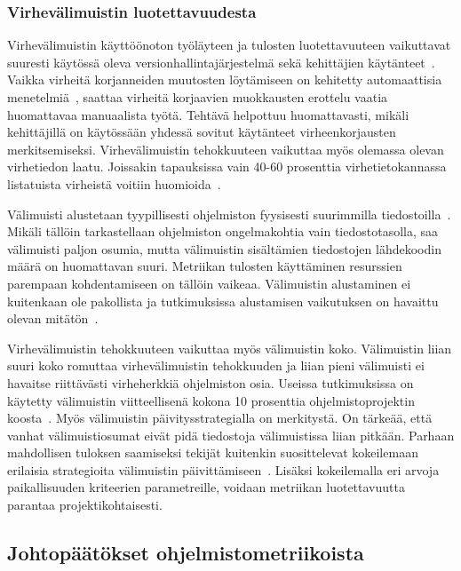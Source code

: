 \documentclass[finnish]{tktltiki2}
\theoremstyle{definition}
\theoremstyle{remark}
\begin{document}
\subsubsection{Virhevälimuistin luotettavuudesta}

Virhevälimuistin käyttöönoton työläyteen ja tulosten luotettavuuteen vaikuttavat suuresti käytössä oleva versionhallintajärjestelmä sekä kehittäjien käytänteet~\cite{SLLZW11}. Vaikka virheitä korjanneiden muutosten löytämiseen on kehitetty automaattisia menetelmiä~\cite{SZZ05, KZKW06}, saattaa virheitä korjaavien muokkausten erottelu vaatia huomattavaa manuaalista työtä. Tehtävä helpottuu huomattavasti, mikäli kehittäjillä on käytössään yhdessä sovitut käytänteet virheenkorjausten merkitsemiseksi. Virhevälimuistin tehokkuuteen vaikuttaa myös olemassa olevan virhetiedon laatu. Joissakin tapauksissa vain 40-60 prosenttia virhetietokannassa listatuista virheistä voitiin huomioida~\cite{KZWZ07}.

Välimuisti alustetaan tyypillisesti ohjelmiston fyysisesti suurimmilla tiedostoilla~\cite{KZWZ07}. Mikäli tällöin tarkastellaan ohjelmiston ongelmakohtia vain tiedostotasolla, saa välimuisti paljon osumia, mutta välimuistin sisältämien tiedostojen lähdekoodin määrä on huomattavan suuri. Metriikan tulosten käyttäminen resurssien parempaan kohdentamiseen on tällöin vaikeaa. Välimuistin alustaminen ei kuitenkaan ole pakollista ja tutkimuksissa alustamisen vaikutuksen on havaittu olevan mitätön~\cite{WFGWW09}.

Virhevälimuistin tehokkuuteen vaikuttaa myös välimuistin koko. Välimuistin liian suuri koko romuttaa virhevälimuistin tehokkuuden ja liian pieni välimuisti ei havaitse riittävästi virheherkkiä ohjelmiston osia. Useissa tutkimuksissa on käytetty välimuistin viitteellisenä kokona 10 prosenttia ohjelmistoprojektin koosta~\cite{SLLZW11, KZWZ07}. Myös välimuistin päivitysstrategialla on merkitystä. On tärkeää, että vanhat välimuistiosumat eivät pidä tiedostoja välimuistissa liian pitkään. Parhaan mahdollisen tuloksen saamiseksi tekijät kuitenkin suosittelevat kokeilemaan erilaisia strategioita välimuistin päivittämiseen~\cite{KZWZ07}. Lisäksi kokeilemalla eri arvoja paikallisuuden kriteerien parametreille, voidaan metriikan luotettavuutta parantaa projektikohtaisesti.

\subsection{Johtopäätökset ohjelmistometriikoista}
\end{document}
